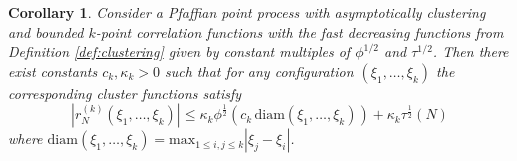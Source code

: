 \documentclass[11pt,reqno]{amsproc}
\newtheorem{corollary}[theorem]{Corollary}
\numberwithin{equation}{section}
\numberwithin{theorem}{section}
\begin{document}
\begin{corollary}
\label{corx}
Consider a Pfaffian point process with asymptotically clustering and bounded $k$-point correlation functions with the fast decreasing functions from Definition \ref{def:clustering} given by constant multiples of $\phi^{1/2}$ and $\tau^{1/2}$.  
Then there exist constants $c_{k}, \kappa_k >0$ such that for any configuration $(\xi_1,\ldots,\xi_k)$ the corresponding cluster functions satisfy
\begin{equation}
|r^{(k)}_{N}(\xi_1,\ldots,\xi_{k})| \leq \kappa_k \phi^{\frac{1}{2}}(c_{k}\,\mathrm{diam}(\xi_1,\ldots,\xi_k))+ \kappa_k \tau^{\frac{1}{2}}(N)
\end{equation}
where $\mathrm{diam}(\xi_1,\ldots,\xi_k) = \mathrm{max}_{1 \leq i,j \leq k}|\xi_j-\xi_i|$.
\end{corollary}
\end{document}
